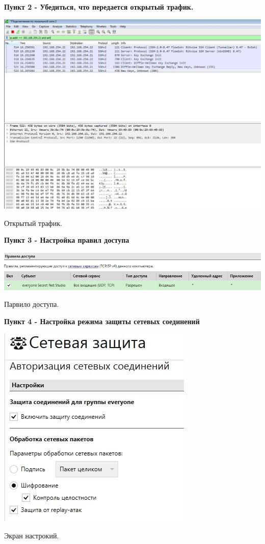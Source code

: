 \documentclass[a4paper,14pt]{extarticle}
\begin{document}
    \textbf{Пункт 2 - Убедиться, что передается открытый трафик.}
    \begin{center}
        \includegraphics[scale=0.3]{pics/2.jpg}

       Открытый трафик. 
    \end{center}

    \textbf{Пункт 3 - Настройка правил доступа}
    \begin{center}
        \includegraphics[scale=0.5]{pics/3.jpg}

       Парвило доступа.
    \end{center}

    \textbf{Пункт 4 - Настройка режима защиты сетевых соединений}
    \begin{center}
        \includegraphics[scale=0.6]{pics/4.jpg}

       Экран настрокий.
    \end{center}
\end{document}
